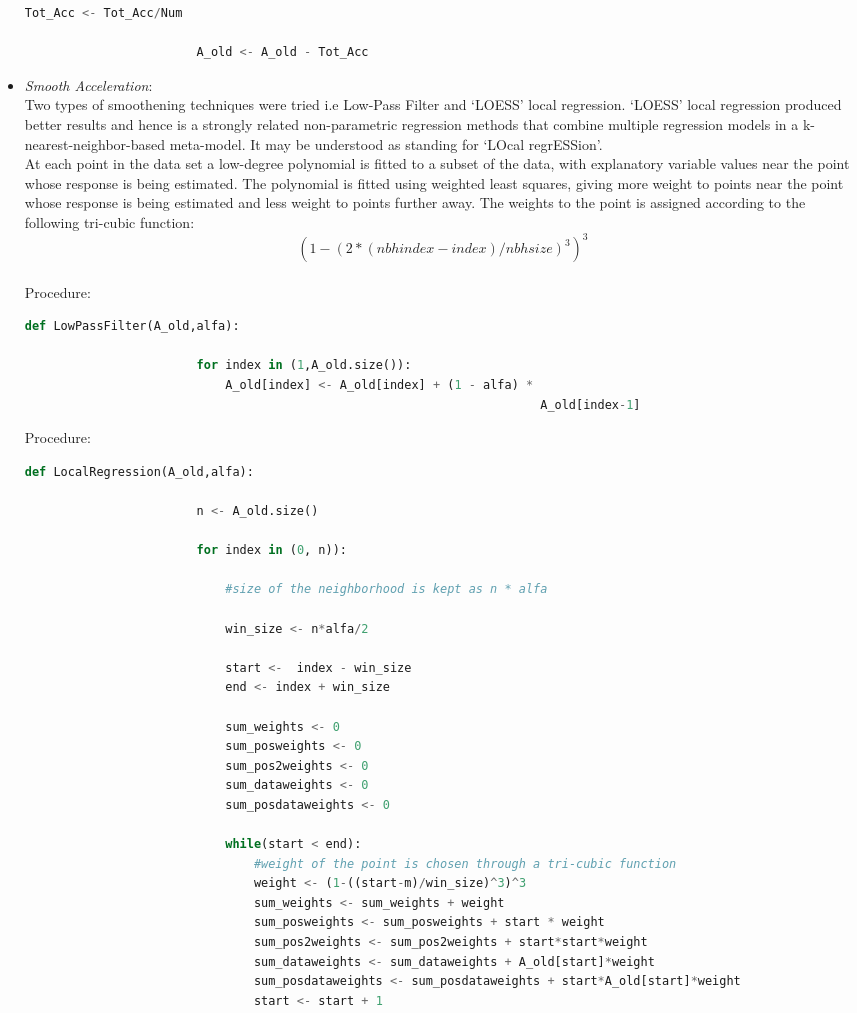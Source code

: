 \documentclass{article}
\begin{document}
\begin{itemize}
\begin{lstlisting}[language=Python, caption=StaticCorrection()]
						Tot_Acc <- Tot_Acc/Num

						A_old <- A_old - Tot_Acc	
				\end{lstlisting}
				\item \textit{Smooth Acceleration}:\\
				Two types of smoothening techniques were tried i.e Low-Pass Filter and `LOESS' local regression. \cite{LocalReg} `LOESS' local regression produced better results and hence is a strongly related non-parametric regression methods that combine multiple regression models in a k-nearest-neighbor-based meta-model. It may be understood as standing for `LOcal regrESSion'.
				\\ At each point in the data set a low-degree polynomial is fitted to a subset of the data, with explanatory variable values near the point whose response is being estimated. The polynomial is fitted using weighted least squares, giving more weight to points near the point whose response is being estimated and less weight to points further away.
				The weights to the point is assigned according to the following tri-cubic function:
				\[ (1 - (2*(nbhindex - index)/nbhsize)^3)^3 \]
				\\ Procedure:
				\begin{lstlisting}[language=Python, caption=LowPassFilter()]
					def LowPassFilter(A_old,alfa):

						for index in (1,A_old.size()):
							A_old[index] <- A_old[index] + (1 - alfa) *  
																		A_old[index-1]	
				\end{lstlisting}

				Procedure:
				\begin{lstlisting}[language=Python, caption=LocalRegression()]
					def LocalRegression(A_old,alfa):

						n <- A_old.size()

						for index in (0, n)):

							#size of the neighborhood is kept as n * alfa

							win_size <- n*alfa/2

							start <-  index - win_size
							end <- index + win_size

							sum_weights <- 0
							sum_posweights <- 0
							sum_pos2weights <- 0
							sum_dataweights <- 0
							sum_posdataweights <- 0

							while(start < end):
								#weight of the point is chosen through a tri-cubic function
								weight <- (1-((start-m)/win_size)^3)^3
								sum_weights <- sum_weights + weight
								sum_posweights <- sum_posweights + start * weight
								sum_pos2weights <- sum_pos2weights + start*start*weight
								sum_dataweights <- sum_dataweights + A_old[start]*weight
								sum_posdataweights <- sum_posdataweights + start*A_old[start]*weight
								start <- start + 1


\end{lstlisting}
\end{itemize}
\end{document}
